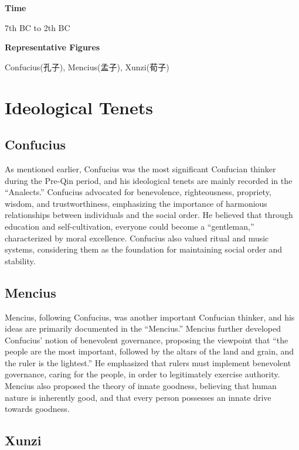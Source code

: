 \documentclass[
]{book}
\begin{document}
\textbf{Time}

7th BC to 2th BC

\textbf{Representative Figures}

Confucius(孔子), Mencius(孟子), Xunzi(荀子)

\hypertarget{ideological-tenets}{%
\section{Ideological Tenets}\label{ideological-tenets}}

\hypertarget{confucius}{%
\subsection{Confucius}\label{confucius}}

As mentioned earlier, Confucius was the most significant Confucian thinker during the Pre-Qin period, and his ideological tenets are mainly recorded in the ``Analects.'' Confucius advocated for benevolence, righteousness, propriety, wisdom, and trustworthiness, emphasizing the importance of harmonious relationships between individuals and the social order. He believed that through education and self-cultivation, everyone could become a ``gentleman,'' characterized by moral excellence. Confucius also valued ritual and music systems, considering them as the foundation for maintaining social order and stability.

\hypertarget{mencius}{%
\subsection{Mencius}\label{mencius}}

Mencius, following Confucius, was another important Confucian thinker, and his ideas are primarily documented in the ``Mencius.'' Mencius further developed Confucius' notion of benevolent governance, proposing the viewpoint that ``the people are the most important, followed by the altars of the land and grain, and the ruler is the lightest.'' He emphasized that rulers must implement benevolent governance, caring for the people, in order to legitimately exercise authority. Mencius also proposed the theory of innate goodness, believing that human nature is inherently good, and that every person possesses an innate drive towards goodness.

\hypertarget{xunzi}{%
\subsection{Xunzi}\label{xunzi}}
\end{document}
